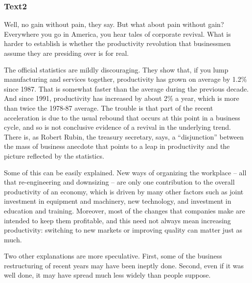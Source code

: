 \documentclass[a4paper]{article}
\begin{document}
\subsubsection{Text2}

\par
Well, no gain without pain, they say. But what about pain without gain? Everywhere you go in America, you hear tales of corporate revival. What is harder to establish is whether the productivity revolution that businessmen assume they are presiding over is for real.

\par
The official statistics are mildly discouraging. They show that, if you lump manufacturing and services together, productivity has grown on average by 1.2\% since 1987. That is somewhat faster than the average during the previous decade. And since 1991, productivity has increased by about 2\% a year, which is more than twice the 1978-87 average. The trouble is that part of the recent acceleration is due to the usual rebound that occurs at this point in a business cycle, and so is not conclusive evidence of a revival in the underlying trend. There is, as Robert Rubin, the treasury secretary, says, a “disjunction” between the mass of business anecdote that points to a leap in productivity and the picture reflected by the statistics.

\par
Some of this can be easily explained. New ways of organizing the workplace -- all that re-engineering and downsizing -- are only one contribution to the overall productivity of an economy, which is driven by many other factors such as joint investment in equipment and machinery, new technology, and investment in education and training. Moreover, most of the changes that companies make are intended to keep them profitable, and this need not always mean increasing productivity: switching to new markets or improving quality can matter just as much.

\par
Two other explanations are more speculative. First, some of the business restructuring of recent years may have been ineptly done. Second, even if it was well done, it may have spread much less widely than people suppose.
\end{document}
